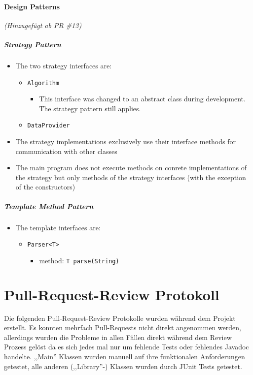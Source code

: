 \documentclass[accentcolor=tud0b,12pt,paper=a4]{tudreport}
\begin{document}
\paragraph{Design Patterns} \textit{(Hinzugefügt ab PR \#13)}
\subparagraph{Strategy Pattern}
\begin{itemize}
\item The two strategy interfaces are:
	\begin{itemize}
	\item \texttt{Algorithm}
		\begin{itemize}
		\item This interface was changed to an abstract class during development. The strategy pattern still applies.
		\end{itemize}
	\item \texttt{DataProvider}
	\end{itemize}
\item The strategy implementations exclusively use their interface methods for communication with other classes
\item The main program does not execute methods on conrete implementations of the strategy but only methods of the strategy interfaces (with the exception of the constructors)
\end{itemize}

\subparagraph{Template Method Pattern}
\begin{itemize}
\item The template interfaces are:
	\begin{itemize}
	\item \texttt{Parser<T>}
	\begin{itemize}
	\item method: \texttt{T parse(String)}
	\end{itemize}
	\end{itemize}
\end{itemize}

\newpage
\section{Pull-Request-Review Protokoll}
Die folgenden Pull-Request-Review Protokolle wurden während dem Projekt erstellt. Es konnten mehrfach Pull-Requests nicht direkt angenommen werden, allerdings wurden die Probleme in allen Fällen direkt während dem Review Prozess gelöst da es sich jedes mal nur um fehlende Tests oder fehlendes Javadoc handelte. ,,Main'' Klassen wurden manuell auf ihre funktionalen Anforderungen getestet, alle anderen (,,Library''-) Klassen wurden durch JUnit Tests getestet.
\end{document}
